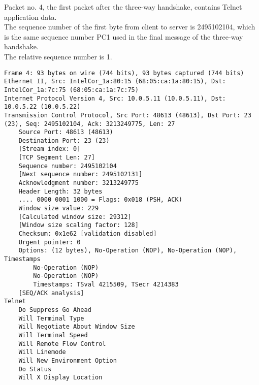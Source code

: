 Packet no. 4, the first packet after the three-way handshake, contains Telnet application data. \\
The sequence number of the first byte from client to server is 2495102104,
which is the same sequence number PC1 used in the final message of the three-way handshake.\\
The relative sequence number is 1.

\begin{lstlisting}
Frame 4: 93 bytes on wire (744 bits), 93 bytes captured (744 bits)
Ethernet II, Src: IntelCor_1a:80:15 (68:05:ca:1a:80:15), Dst: IntelCor_1a:7c:75 (68:05:ca:1a:7c:75)
Internet Protocol Version 4, Src: 10.0.5.11 (10.0.5.11), Dst: 10.0.5.22 (10.0.5.22)
Transmission Control Protocol, Src Port: 48613 (48613), Dst Port: 23 (23), Seq: 2495102104, Ack: 3213249775, Len: 27
    Source Port: 48613 (48613)
    Destination Port: 23 (23)
    [Stream index: 0]
    [TCP Segment Len: 27]
    Sequence number: 2495102104
    [Next sequence number: 2495102131]
    Acknowledgment number: 3213249775
    Header Length: 32 bytes
    .... 0000 0001 1000 = Flags: 0x018 (PSH, ACK)
    Window size value: 229
    [Calculated window size: 29312]
    [Window size scaling factor: 128]
    Checksum: 0x1e62 [validation disabled]
    Urgent pointer: 0
    Options: (12 bytes), No-Operation (NOP), No-Operation (NOP), Timestamps
        No-Operation (NOP)
        No-Operation (NOP)
        Timestamps: TSval 4215509, TSecr 4214383
    [SEQ/ACK analysis]
Telnet
    Do Suppress Go Ahead
    Will Terminal Type
    Will Negotiate About Window Size
    Will Terminal Speed
    Will Remote Flow Control
    Will Linemode
    Will New Environment Option
    Do Status
    Will X Display Location
\end{lstlisting}
